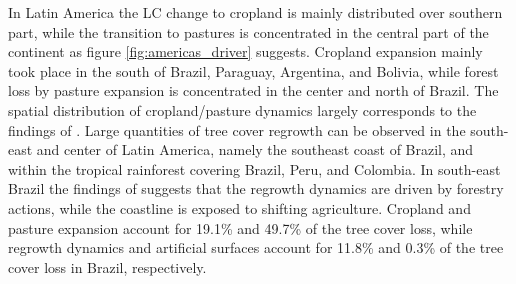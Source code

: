 			In Latin America the \ac{LC} change to cropland is mainly distributed over southern part, while the transition to pastures is concentrated in the central part of the continent as figure \ref{fig:americas_driver} suggests. Cropland expansion mainly took place in the south of Brazil, Paraguay, Argentina, and Bolivia, while forest loss by pasture expansion is concentrated in the center and north of Brazil. The spatial distribution of cropland/pasture dynamics largely corresponds to the findings of \citet{Graesser2015}. Large quantities of tree cover regrowth can be observed in the south-east and center of Latin America, namely the southeast coast of Brazil, and within the tropical rainforest covering Brazil, Peru, and Colombia. In south-east Brazil the findings of \citet{Curtis2018} suggests that the regrowth dynamics are driven by forestry actions, while the coastline is exposed to shifting agriculture. Cropland and pasture expansion account for 19.1\% and 49.7\% of the tree cover loss, while regrowth dynamics and artificial surfaces account for 11.8\% and 0.3\% of the tree cover loss in Brazil, respectively. 

